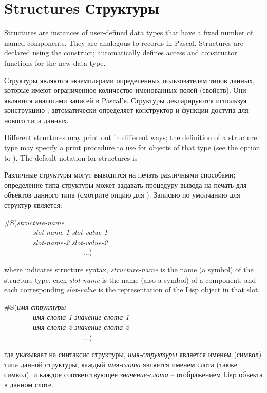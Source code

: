 \section{Structures Структуры}

Structures are instances of user-defined data types that have
a fixed number of named components.  They are analogous to
records in Pascal.
Structures are declared using the  construct;
 automatically defines access and constructor functions for
the new data type.

Структуры являются экземплярами определенных пользователем типов данных, которые
имеют ограниченное количество именованных полей (свойств). Они являются
аналогами записей в Pascal'е.
Структуры декларируются используя конструкцию ;
 автоматически определяет конструктор и функции доступа для нового
типа данных.

Different structures may print out in different ways;
the definition of a structure type may specify a print procedure
to use for objects of that type (see the
 option to ).
The default notation for structures is

Различные структуры могут выводится на печать различными способами;
определение типа структуры может задавать процедуру вывода на печать для
объектов данного типа (смотрите опцию  для ).
Записью по умолчанию для структур является:
\begin{lisp}
\#S({\it structure-name} \\
~~~~~~~~{\it slot-name-1} {\it slot-value-1} \\
~~~~~~~~{\it slot-name-2} {\it slot-value-2} \\
~~~~~~~~~~~~~~~~~~~~~~...)
\end{lisp}
where  indicates structure syntax, {\it structure-name} is
the name (a symbol) of the structure type, each {\it slot-name} is the name
(also a symbol) of a component, and each corresponding {\it slot-value}
is the representation of the Lisp object in that slot.

\begin{lisp}
\#S({\it имя-структуры} \\
~~~~~~~~{\it имя-слота-1} {\it значение-слота-1} \\
~~~~~~~~{\it имя-слота-2} {\it значение-слота-2} \\
~~~~~~~~~~~~~~~~~~~~~~...)
\end{lisp}
где  указывает на синтаксис структуры, {\it имя-структуры} является
именем (символ) типа данной структуры, каждый {\it имя-слота} является именем
слота (также символ), и каждое соответствующее {\it значение-слота} --
отображением Lisp объекта в данном слоте.

